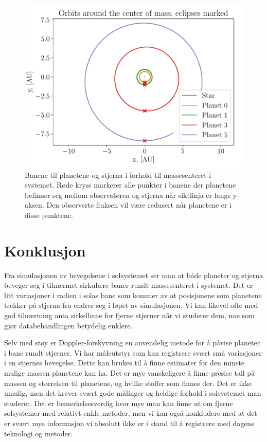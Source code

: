 \documentclass[reprint, english,notitlepage]{revtex4-1}  %
\begin{document}
\begin{figure}
  \includegraphics[width=\linewidth]{../output/plots/orbits_eclipse.pdf}
  \caption{Banene til planetene og stjerna i forhold til massesenteret i systemet. Røde kryss markerer alle punkter i banene der planetene befinner seg mellom observatøren og stjerna når siktlinja er langs y-aksen. Den observerte fluksen vil være redusert når planetene er i disse punktene.}
  \label{fig:orbits_eclipse}
\end{figure}



\section{Konklusjon}

Fra simulasjonen av bevegelsene i solsystemet ser man at både planeter og stjerna beveger seg i tilnærmet sirkulære baner rundt massesenteret i systemet. Det er litt variasjoner i radien i solas bane som kommer av at posisjonene som planetene trekker på stjerna fra endrer seg i løpet av simulasjonen. Vi kan likevel ofte med god tilnærming anta sirkelbane for fjerne stjerner når vi studerer dem, noe som gjør databehandlingen betydelig enklere.

Selv med støy er Doppler-forskyvning en anvendelig metode for å påvise planeter i bane rundt stjerner. Vi har måleutstyr som kan registrere svært små variasjoner i en stjernes bevegelse. Dette kan brukes til å finne estimater for den minste mulige massen planetene kan ha. Det er mye vanskeligere å finne presise tall på massen og størrelsen til planetene, og hvilke stoffer som finnes der. Det er ikke umulig, men det krever svært gode målinger og heldige forhold i solsystemet man studerer. Det er bemerkelsesverdig hvor mye man kan finne ut om fjerne solsystemer med relativt enkle metoder, men vi kan også konkludere med at det er svært mye informasjon vi absolutt ikke er i stand til å registrere med dagens teknologi og metoder.
\end{document}

